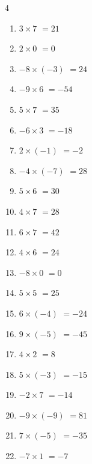 \begin{multicols}{4}
\begin{enumerate}
  \item $3\times 7$
        $=21$

  \item $2\times 0$
        $=0$

  \item $-8\times (-3)$
        $=24$

  \item $-9\times 6$
        $=-54$

  \item $5\times 7$
        $=35$

  \item $-6\times 3$
        $=-18$

  \item $2\times (-1)$
        $=-2$

  \item $-4\times (-7)$
        $=28$

  \item $5\times 6$
        $=30$

  \item $4\times 7$
        $=28$

  \item $6\times 7$
        $=42$

  \item $4\times 6$
        $=24$

\columnbreak %

  \item $-8\times 0$
        $=0$

  \item $5\times 5$
        $=25$

  \item $6\times (-4)$
        $=-24$

  \item $9\times (-5)$
        $=-45$

  \item $4\times 2$
        $=8$

  \item $5\times (-3)$
        $=-15$

  \item $-2\times 7$
        $=-14$

  \item $-9\times (-9)$
        $=81$

  \item $7\times (-5)$
        $=-35$

  \item $-7\times 1$
        $=-7$


\end{enumerate}
\end{multicols}
